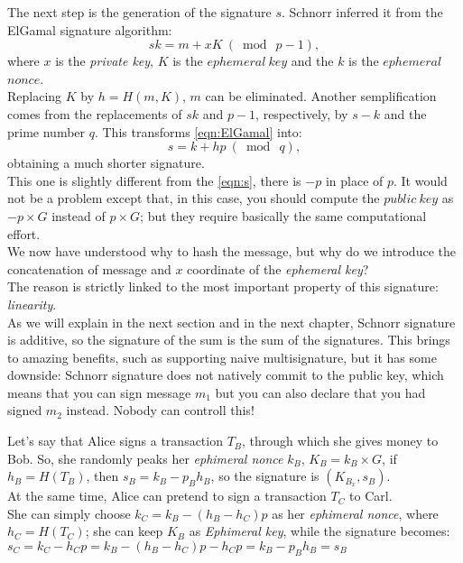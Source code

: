 The next step is the generation of the signature $s$. Schnorr \cite{Schnorr} inferred it from the ElGamal signature algorithm:
\begin{equation}
\label{eqn:ElGamal}
sk=m+xK\ (\bmod\ p-1),
\end{equation}
where $x$ is the \textit{private key}, $K$ is the $ephemeral\ key$ and the $k$ is the $ephemeral$ $nonce$.\\
Replacing $K$ by $h=H(m,K)$, $m$ can be eliminated. Another semplification comes from the replacements of $sk$ and $p-1$, respectively, by $s-k$ and the prime number $q$. This transforms \eqref{eqn:ElGamal} into:
\begin{equation}
s=k+hp\ (\bmod\ q),
\end{equation}
obtaining a much shorter signature.\\
This one is slightly different from the \eqref{eqn:s}, there is $-p$ in place of $p$. It would not be a problem except that, in this case, you should compute the $public\ key$ as $-p \times G$ instead of $p \times G$; but they require basically the same computational effort.\\
We now have understood why to hash the message, but why do we introduce the concatenation of message and $x$ coordinate of the \textit{ephemeral key}?\\
The reason is strictly linked to the most important property of this signature: \textit{linearity}.\\
As we will explain in the next section and in the next chapter, Schnorr signature is additive, so the signature of the sum is the sum of the signatures. This brings to amazing benefits, such as supporting naive multisignature, but it has some downside: Schnorr signature does not natively commit to the public key, which means that you can sign message $m_{1}$ but you can also declare that you had signed $m_{2}$ instead. Nobody can controll this! 

\begin{example}
	Let's say that Alice signs a transaction $T_{B}$, through which she gives money to Bob. So, she randomly peaks her \textit{ephimeral nonce} $k_{B}$, $K_{B}=k_{B}\times G$, if $h_{B}=H(T_{B})$, then $s_{B}=k_{B}-p_{B}h_{B}$, so the signature is $(K_{B_{x}},s_{B})$.\\
	At the same time, Alice can pretend to sign a transaction $T_{C}$ to Carl. \\
	She can simply choose $k_{C}=k_{B}-(h_{B}-h_{C})p$ as her \textit{ephimeral nonce}, where $h_{C}=H(T_{C})$; she can keep $K_{B}$ as \textit{Ephimeral key}, while the signature becomes:\\
	$s_{C}= k_{C}-h_{C}p=k_{B}-(h_{B}-h_{C})p-h_{C}p=k_{B}-p_{B}h_{B}=s_{B}$\\
\end{example}


